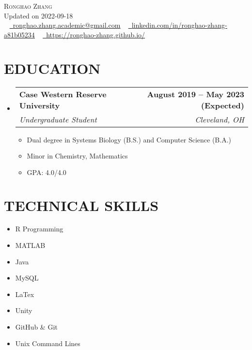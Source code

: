 \documentclass[letterpaper,11pt]{article}
\makeatletter
\newcommand{\resumeItem}[1]{
	\item\small{
		{#1 \vspace{0pt}}
	}
}
\newcommand{\resumeSubheading}[4]{
	\vspace{-2pt}\item
	\begin{tabular*}{1.0\textwidth}[t]{l@{\extracolsep{\fill}}r}
		\textbf{#1} & \textbf{\small #2} \\
		\textit{\small#3} & \textit{\small #4} \\
	\end{tabular*}\vspace{-4pt}
}
\newcommand{\resumeSubHeadingListStart}{\begin{itemize}[leftmargin=0.0in, label={}]}
\newcommand{\resumeSubHeadingListEnd}{\end{itemize}}
\newcommand{\resumeItemListStart}{\begin{itemize}}
\newcommand{\resumeItemListEnd}{\end{itemize}\vspace{-5pt}}
\makeatother
\begin{document}
	
	\begin{center}
		{\Huge \scshape Ronghao Zhang} 
		\\ \vspace{5pt}
		Updated on 2022-09-18 
		\\ \vspace{5pt}
		\small \raisebox{-0.1\height} ~ 
		\href{mailto:x@gmail.com}{\raisebox{-0.2\height}\faEnvelope\          \underline{ronghao.zhang.academic@gmail.com}} ~ 
		\href{https://linkedin.com/in//}{\raisebox{-0.2\height}\faLinkedin\     \underline{linkedin.com/in/ronghao-zhang-a81b05234}}  ~
		\href{https://ronghao-zhang.github.io/}{\raisebox{-0.2\height}\faGithub\ \underline{https://ronghao-zhang.github.io/}}
		\vspace{1pt}
	\end{center}
	
	\section{EDUCATION}
	\resumeSubHeadingListStart
	\resumeSubheading
	{Case Western Reserve University}{August 2019 -- May 2023 (Expected)}
	{Undergraduate Student}{Cleveland, OH}
	\resumeItemListStart
	\resumeItem{Dual degree in Systems Biology (B.S.) and Computer Science (B.A.)}
	\resumeItem{Minor in Chemistry, Mathematics}
	\resumeItem{GPA: 4.0/4.0}
	\resumeItemListEnd
	\resumeSubHeadingListEnd
	
	\section{TECHNICAL SKILLS}
	\begin{multicols}{4}
		\begin{itemize}[itemsep=-2pt, parsep=5pt]
			\item\small R Programming
			\item       MATLAB 
			\item       Java
			\item       MySQL
			\item       LaTex
			\item       Unity
			\item       GitHub \& Git 
			\item       Unix Command Lines
			
		\end{itemize}
	\end{multicols}
	\vspace*{2.0\multicolsep}
	\vspace{7pt}
	
\end{document}
